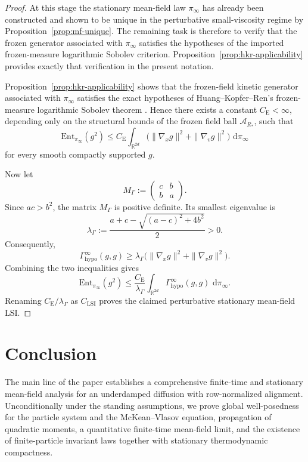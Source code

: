 \documentclass[11pt]{article}
\theoremstyle{definition}
\theoremstyle{remark}
\newcommand{\R}{\mathbb{R}}
\newcommand{\Ent}{\mathrm{Ent}}
\newcommand{\dd}{\,\mathrm{d}}
\begin{document}
\begin{proof}
At this stage the stationary mean-field law \(\pi_\infty\) has already been
constructed and shown to be unique in the perturbative small-viscosity regime
by Proposition~\ref{prop:mf-unique}. The remaining task is therefore to verify
that the frozen generator associated with \(\pi_\infty\) satisfies the
hypotheses of the imported frozen-measure logarithmic Sobolev criterion.
Proposition~\ref{prop:hkr-applicability} provides exactly that verification in
the present notation.

Proposition~\ref{prop:hkr-applicability} shows that the frozen-field kinetic
generator associated with \(\pi_\infty\) satisfies the exact hypotheses of
Huang--Kopfer--Ren's frozen-measure logarithmic Sobolev theorem
\cite[Theorem~3.5]{huang2026logsobolev}. Hence there exists a constant
\(C_{\mathrm E}<\infty\), depending only
on the structural bounds of the frozen field ball \(\mathcal A_{R_*}\), such
that
\[
\Ent_{\pi_\infty}(g^2)
\le
C_{\mathrm E}
\int_{\R^{2d}} \bigl(\|\nabla_x g\|^2+\|\nabla_v g\|^2\bigr)\,\dd\pi_\infty
\]
for every smooth compactly supported \(g\).

Now let
\[
M_\Gamma:=
\begin{pmatrix}
c & b\\
b & a
\end{pmatrix}.
\]
Since \(ac>b^2\), the matrix \(M_\Gamma\) is positive definite. Its smallest
eigenvalue is
\[
\lambda_\Gamma
:=
\frac{a+c-\sqrt{(a-c)^2+4b^2}}{2}>0.
\]
Consequently,
\[
\Gamma_{\mathrm{hypo}}^\infty(g,g)
\ge
\lambda_\Gamma\bigl(\|\nabla_x g\|^2+\|\nabla_v g\|^2\bigr).
\]
Combining the two inequalities gives
\[
\Ent_{\pi_\infty}(g^2)
\le
\frac{C_{\mathrm E}}{\lambda_\Gamma}
\int_{\R^{2d}}\Gamma_{\mathrm{hypo}}^\infty(g,g)\,\dd\pi_\infty.
\]
Renaming \(C_{\mathrm E}/\lambda_\Gamma\) as \(C_{\mathrm{LSI}}\) proves the
claimed perturbative stationary mean-field LSI.
\end{proof}

\section{Conclusion}

The main line of the paper establishes a comprehensive finite-time and stationary
mean-field analysis for an underdamped diffusion with row-normalized alignment.
Unconditionally under the standing assumptions, we prove global well-posedness
for the particle system and the McKean--Vlasov equation, propagation of
quadratic moments, a quantitative finite-time mean-field limit, and the
existence of finite-particle invariant laws together with stationary
thermodynamic compactness.
\end{document}
